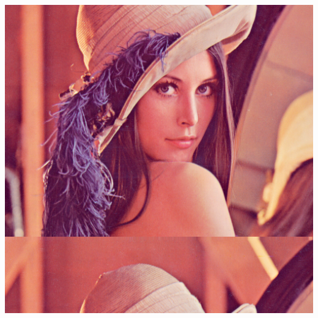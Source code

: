 \documentclass{book}
\begin{document}
\begin{exercise}
\begin{center}
\includegraphics[scale=0.2]{lena-scrolled-3.png}
\end{center}
\end{exercise}
\end{document}
